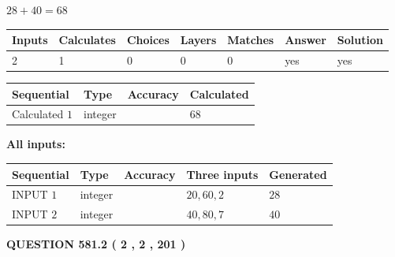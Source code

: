 \documentclass[12pt]{article}
\begin{document}
 

$ %
28 +  %
40=   %
68$
 
 
\noindent{}
 
 

 
   
   
   
   
\noindent\begin{tabular}{|l|l|l|l|l|l|l|}
 \hline
Inputs & Calculates & Choices & Layers & Matches & Answer & Solution \\ \hline
 2  & 
 1  & 
 0
  & 
 0  & 
 0  & 
  yes & 
  yes 
  \\ \hline
 \end{tabular}
   
   
   
   
\noindent{}
   
   
  
  
\noindent\begin{tabular}{|l|l|l|l|}
\hline
 Sequential & Type & Accuracy & Calculated \\ 
\hline
 
 
  Calculated $  1 $ & integer &  & 
  $ 68 $ 
 \\  \hline  
 \end{tabular}
   
   
   
   
\noindent\vspace{0.1in}\hspace{-0.08in} {\textbf{\Large{All inputs: }}}
   
   
  
  
\noindent\begin{tabular}{|l|l|l|l|l|}
\hline
 Sequential & Type & Accuracy & Three inputs & Generated \\ 
\hline
 
 
  INPUT $  1 $ & integer &  & $
 20
 , 
 60
 , 
 2
 $ & $ 28 $ 
 \\  \hline  
 
 
  INPUT $  2 $ & integer &  & $
 40
 , 
 80
 , 
 7
 $ & $ 40 $ 
 \\  \hline  
 \end{tabular}
   
   
  
\vspace{0.2in}
  
{\textbf{\Large{QUESTION
581.2 
 ( 2 , 2 , 201 )
}}}
  
\end{document}
